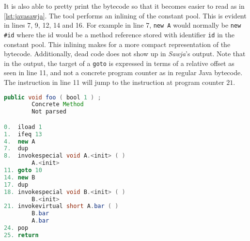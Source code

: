 It is also able to pretty print the bytecode so that it becomes easier to read as in \cref{lst:javasawja}. 
The tool performs an inlining of the constant pool. This is evident in lines 7, 9, 12, 14 and 16. For example in line 7, \texttt{new A} would normally be \texttt{new \#id} where the id would be a method reference stored with identifier \texttt{id} in the constant pool. This inlining makes for a more compact representation of the bytecode. Additionally, dead code does not show up in \textit{Sawja}'s output.
Note that in the output, the target of a \texttt{goto} is expressed in terms of a relative offset as seen in line 11, and not a concrete program counter as in regular Java bytecode. The instruction in line 11 will jump to the instruction at program counter $21$.

\begin{minipage}{\linewidth}
\begin{lstlisting}[caption=Sawja sample. Note that the numbers on the inner left side are program counter values.,language=Java,label=lst:javasawja]
public void foo ( bool 1 ) ;
		Concrete Method
    	Not parsed

0.  iload 1
1.  ifeq 13
4.  new A
7.  dup
8.  invokespecial void A.<init> ( )
        A.<init>
11. goto 10
14. new B
17. dup
18. invokespecial void B.<init> ( )
        B.<init>
21. invokevirtual short A.bar ( )
        B.bar
        A.bar
24. pop
25. return

\end{lstlisting}
\end{minipage}

